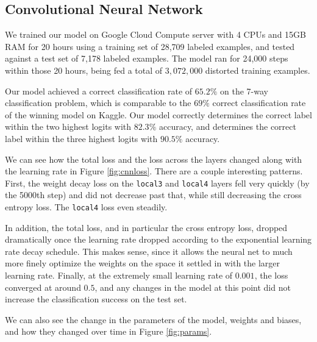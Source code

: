 \documentclass[11pt, twocolumn, twoside]{article}
\begin{document}
\subsection{Convolutional Neural Network}

We trained our model on Google Cloud Compute server with 4 CPUs and 15GB RAM for 20 hours using a training set of 28,709 labeled examples, and tested against a test set of 7,178 labeled examples. The model ran for 24,000 steps within those 20 hours, being fed a total of $3,072,000$ distorted training examples.

Our model achieved a correct classification rate of $65.2\%$ on the 7-way classification problem, which is comparable to the $69\%$ correct classification rate of the winning model on Kaggle. Our model correctly determines the correct label within the two highest logits with $82.3\%$ accuracy, and determines the correct label within the three highest logits with $90.5\%$ accuracy.

We can see how the total loss and the loss across the layers changed along with the learning rate in Figure \ref{fig:cnnloss}. There are a couple interesting patterns. First, the weight decay loss on the \texttt{local3} and \texttt{local4} layers fell very quickly (by the 5000th step) and did not decrease past that, while still decreasing the cross entropy loss. The \texttt{local4} loss even steadily. 

In addition, the total loss, and in particular the cross entropy loss, dropped dramatically once the learning rate dropped according to the exponential learning rate decay schedule. This makes sense, since it allows the neural net to much more finely optimize the weights on the space it settled in with the larger learning rate. Finally, at the extremely small learning rate of $0.001$, the loss converged at around $0.5$, and any changes in the model at this point did not increase the classification success on the test set.

We can also see the change in the parameters of the model, weights and biases, and how they changed over time in Figure \ref{fig:params}.
\end{document}
